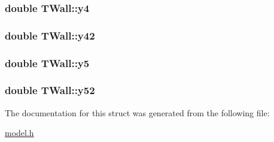 \subsubsection[{\texorpdfstring{y4}{y4}}]{\setlength{\rightskip}{0pt plus 5cm}double T\+Wall\+::y4}\hypertarget{struct_t_wall_a638078bb94d412cd0a59584ad2a35717}{}\label{struct_t_wall_a638078bb94d412cd0a59584ad2a35717}
\subsubsection[{\texorpdfstring{y42}{y42}}]{\setlength{\rightskip}{0pt plus 5cm}double T\+Wall\+::y42}\hypertarget{struct_t_wall_a56fb37ad512958d7b1f77e870cc214ad}{}\label{struct_t_wall_a56fb37ad512958d7b1f77e870cc214ad}
\subsubsection[{\texorpdfstring{y5}{y5}}]{\setlength{\rightskip}{0pt plus 5cm}double T\+Wall\+::y5}\hypertarget{struct_t_wall_affb011f427ae51e9c47b4a319e5a0d1d}{}\label{struct_t_wall_affb011f427ae51e9c47b4a319e5a0d1d}
\subsubsection[{\texorpdfstring{y52}{y52}}]{\setlength{\rightskip}{0pt plus 5cm}double T\+Wall\+::y52}\hypertarget{struct_t_wall_ac51217cd6c93f58347798b269ac2f4ab}{}\label{struct_t_wall_ac51217cd6c93f58347798b269ac2f4ab}


The documentation for this struct was generated from the following file\+:\begin{DoxyCompactItemize}
\item 
\hyperlink{model_8h}{model.\+h}\end{DoxyCompactItemize}
